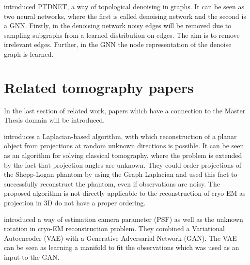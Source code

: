 


\citet{learningToDrop} introduced PTDNET, a way of topological denoising in graphs.
It can be seen as two neural networks, where the first is called denoising network and the second is a GNN.
Firstly, in the denoising network noisy edges will be removed due to
sampling subgraphs from a learned distribution on edges. The aim is to remove 
irrelevant edges. Further, in the GNN the node representation of the denoise graph is learned.



\section{Related tomography papers}
In the last section of related work, papers which have a connection to the Master Thesis domain will be introduced.

\citet{LaplaceRandomProjections} introduces a Laplacian-based algorithm, with which 
reconstruction of a planar object from projections at random unknown directions is possible.
It can be seen as an algorithm for solving classical tomography, where the problem is extended
by the fact that projection angles are unknown. 
They could order projections of the Shepp-Logan phantom by using the Graph Laplacian 
and used this fact to successfully reconstruct the phantom, even if observations are noisy. 
The proposed algorithm is not directly applicable to the reconstruction of cryo-EM 
as projection in 3D do not have a proper ordering.

\citet{cryoEmVAE-GAN} introduced a way of estimation camera parameter (PSF) as well
as the unknown rotation in cryo-EM reconstruction problem. 
They combined a Variational Autoencoder (VAE) with a Generative Adversarial Network (GAN).
The VAE can be seen as learning a manifold to fit the observations
which was used as an input to the GAN.

